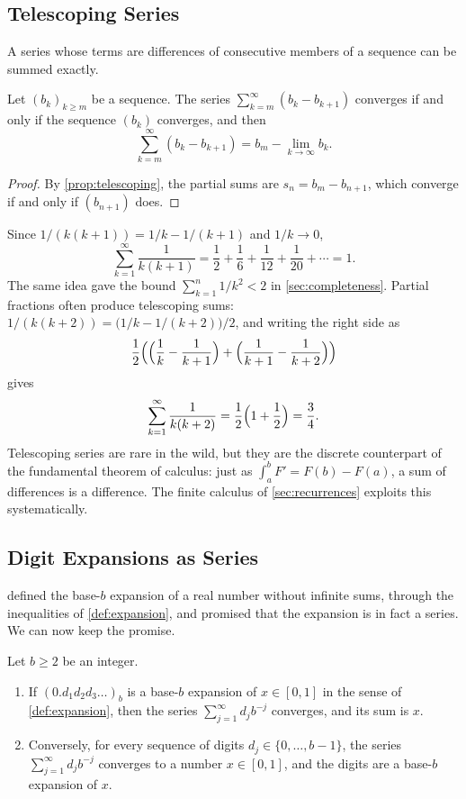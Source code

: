 \subsection{Telescoping Series}

A series whose terms are differences of consecutive members of a sequence can be summed exactly.

\begin{proposition}
\label{prop:telescoping-series}
Let $(b_k)_{k\ge m}$ be a sequence. The series $\sum_{k=m}^\infty(b_k-b_{k+1})$ converges if and only if the sequence $(b_k)$ converges, and then
\[
\sum_{k=m}^\infty(b_k-b_{k+1})=b_m-\lim_{k\to\infty}b_k .
\]
\end{proposition}

\begin{proof}
By \cref{prop:telescoping}, the partial sums are $s_n=b_m-b_{n+1}$, which converge if and only if $(b_{n+1})$ does.
\end{proof}

Since $1/(k(k+1))=1/k-1/(k+1)$ and $1/k\to0$,
\[
\sum_{k=1}^\infty\frac1{k(k+1)}=\frac12+\frac16+\frac1{12}+\frac1{20}+\cdots=1 .
\]
The same idea gave the bound $\sum_{k=1}^n1/k^2<2$ in \cref{sec:completeness}. Partial fractions often produce telescoping sums: $1/(k(k+2))=\bigl(1/k-1/(k+2)\bigr)/2$, and writing the right side as
\[
\frac12\Bigl(\Bigl(\frac1k-\frac1{k+1}\Bigr)+\Bigl(\frac1{k+1}-\frac1{k+2}\Bigr)\Bigr)
\]
gives
\[
\sum_{k=1}^\infty\frac1{k(k+2)}=\frac12\Bigl(1+\frac12\Bigr)=\frac34 .
\]
Telescoping series are rare in the wild, but they are the discrete counterpart of the fundamental theorem of calculus: just as $\int_a^bF'=F(b)-F(a)$, a sum of differences is a difference. The finite calculus of \cref{sec:recurrences} exploits this systematically.

\subsection{Digit Expansions as Series}

 defined the base-$b$ expansion of a real number without infinite sums, through the inequalities of \cref{def:expansion}, and promised that the expansion is in fact a series. We can now keep the promise.

\begin{proposition}
\label{prop:expansion-series}
Let $b\ge2$ be an integer.
\begin{enumerate}
\item If $(0.d_1d_2d_3\ldots)_b$ is a base-$b$ expansion of $x\in[0,1]$ in the sense of \cref{def:expansion}, then the series $\sum_{j=1}^\infty d_jb^{-j}$ converges, and its sum is $x$.
\item Conversely, for every sequence of digits $d_j\in\{0,\ldots,b-1\}$, the series $\sum_{j=1}^\infty d_jb^{-j}$ converges to a number $x\in[0,1]$, and the digits are a base-$b$ expansion of $x$.
\end{enumerate}
\end{proposition}

